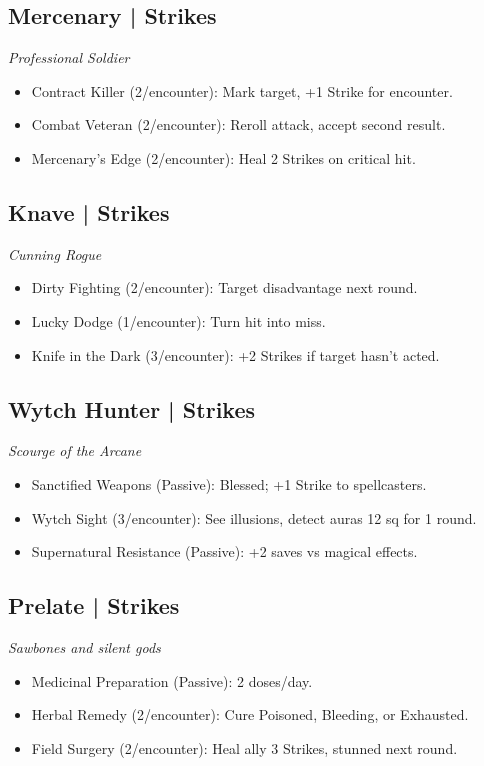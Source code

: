 \documentclass[10pt,twoside]{article}
\newenvironment{rpgtwocol}
  {\begin{multicols}{2}[\vspace{2pt}]\raggedcolumns\small}
  {\end{multicols}}
\begin{document}
\begin{rpgtwocol}

\newcommand{\grimclass}[3]{%
  \subsection{#1}
  \textit{#2}
  \vspace{2pt}
  \begin{summarybox}[title={}]
  \small
  #3
  \end{summarybox}
  \vspace{4pt}
}

\grimclass{Mercenary \;| Strikes}{Professional Soldier}{
\begin{itemize}[leftmargin=8pt, itemsep=2pt]
\item Contract Killer (2/encounter): Mark target, +1 Strike for encounter.
\item Combat Veteran (2/encounter): Reroll attack, accept second result.
\item Mercenary's Edge (2/encounter): Heal 2 Strikes on critical hit.
\end{itemize}
}

\grimclass{Knave \;| Strikes}{Cunning Rogue}{
\begin{itemize}[leftmargin=8pt, itemsep=2pt]
\item Dirty Fighting (2/encounter): Target disadvantage next round.
\item Lucky Dodge (1/encounter): Turn hit into miss.
\item Knife in the Dark (3/encounter): +2 Strikes if target hasn't acted.
\end{itemize}
}

\grimclass{Wytch Hunter \;| Strikes}{Scourge of the Arcane}{
\begin{itemize}[leftmargin=8pt, itemsep=2pt]
\item Sanctified Weapons (Passive): Blessed; +1 Strike to spellcasters.
\item Wytch Sight (3/encounter): See illusions, detect auras 12 sq for 1 round.
\item Supernatural Resistance (Passive): +2 saves vs magical effects.
\end{itemize}
}

\grimclass{Prelate \;| Strikes}{Sawbones and silent gods}{
\begin{itemize}[leftmargin=8pt, itemsep=2pt]
\item Medicinal Preparation (Passive): 2 doses/day.
\item Herbal Remedy (2/encounter): Cure Poisoned, Bleeding, or Exhausted.
\item Field Surgery (2/encounter): Heal ally 3 Strikes, stunned next round.
\end{itemize}
}


\end{rpgtwocol}
\end{document}
